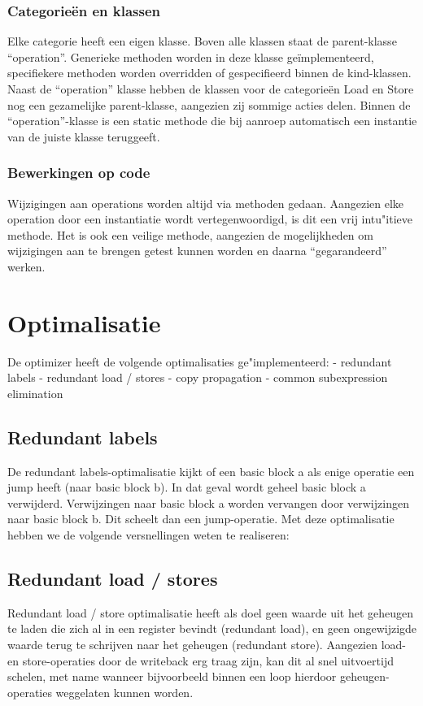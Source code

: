 \documentclass[a4paper,10pt]{article}
\begin{document}
\subsubsection{Categorie\"en en klassen}
Elke categorie heeft een eigen klasse. Boven alle klassen staat de
parent-klasse ``operation''. Generieke methoden worden in deze klasse
ge\"implementeerd, specifiekere methoden worden overridden of gespecifieerd
binnen de kind-klassen. Naast de ``operation'' klasse hebben de klassen voor de
categorie\"en Load en Store nog een gezamelijke parent-klasse, aangezien zij
sommige acties delen. Binnen de ``operation''-klasse is een static methode die
bij aanroep automatisch een instantie van de juiste klasse teruggeeft.

\subsubsection{Bewerkingen op code}
Wijzigingen aan operations worden altijd via methoden gedaan. Aangezien elke
operation door een instantiatie wordt vertegenwoordigd, is dit een vrij
intu"itieve methode. Het is ook een veilige methode, aangezien de mogelijkheden
om wijzigingen aan te brengen getest kunnen worden en daarna ``gegarandeerd''
werken.

\section{Optimalisatie}
De optimizer heeft de volgende optimalisaties ge"implementeerd:
- redundant labels
- redundant load / stores
- copy propagation
- common subexpression elimination

\subsection{Redundant labels}
De redundant labels-optimalisatie kijkt of een basic block a als enige
operatie een jump heeft (naar basic block b). In dat geval wordt geheel basic
block a verwijderd. Verwijzingen naar basic block a worden vervangen door
verwijzingen naar basic block b. Dit scheelt dan een jump-operatie.
Met deze optimalisatie hebben we de volgende versnellingen weten te 
realiseren:

\subsection{Redundant load / stores}
Redundant load / store optimalisatie heeft als doel geen waarde uit het 
geheugen te laden die zich al in een register bevindt (redundant load), en 
geen ongewijzigde waarde terug te schrijven naar het geheugen (redundant 
store). Aangezien load- en store-operaties door de writeback erg traag 
zijn, kan dit al snel uitvoertijd schelen, met name wanneer bijvoorbeeld 
binnen een loop hierdoor geheugen-operaties weggelaten kunnen worden.
\end{document}
